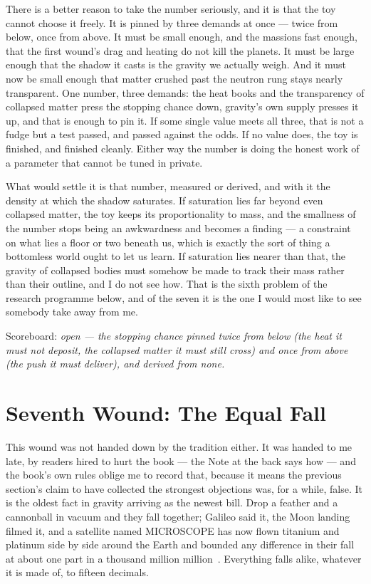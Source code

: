 \documentclass[fontsize=11pt,paper=a4,pagesize=auto,parskip=half-]{scrbook}
\begin{document}
There is a better reason to take the number seriously, and it is that the toy cannot choose it freely. It is pinned by three demands at once --- twice from below, once from above. It must be small enough, and the massions fast enough, that the first wound's drag and heating do not kill the planets. It must be large enough that the shadow it casts is the gravity we actually weigh. And it must now be small enough that matter crushed past the neutron rung stays nearly transparent. One number, three demands: the heat books and the transparency of collapsed matter press the stopping chance down, gravity's own supply presses it up, and that is enough to pin it. If some single value meets all three, that is not a fudge but a test passed, and passed against the odds. If no value does, the toy is finished, and finished cleanly. Either way the number is doing the honest work of a parameter that cannot be tuned in private.

What would settle it is that number, measured or derived, and with it the density at which the shadow saturates. If saturation lies far beyond even collapsed matter, the toy keeps its proportionality to mass, and the smallness of the number stops being an awkwardness and becomes a finding --- a constraint on what lies a floor or two beneath us, which is exactly the sort of thing a bottomless world ought to let us learn. If saturation lies nearer than that, the gravity of collapsed bodies must somehow be made to track their mass rather than their outline, and I do not see how. That is the sixth problem of the research programme below, and of the seven it is the one I would most like to see somebody take away from me.


Scoreboard: \emph{open --- the stopping chance pinned twice from below (the heat it must not deposit, the collapsed matter it must still cross) and once from above (the push it must deliver), and derived from none.}

\section{Seventh Wound: The Equal Fall}

This wound was not handed down by the tradition either. It was handed to me late, by readers hired to hurt the book --- the Note at the back says how --- and the book's own rules oblige me to record that, because it means the previous section's claim to have collected the strongest objections was, for a while, false. It is the oldest fact in gravity arriving as the newest bill. Drop a feather and a cannonball in vacuum and they fall together; Galileo said it, the Moon landing filmed it, and a satellite named MICROSCOPE has now flown titanium and platinum side by side around the Earth and bounded any difference in their fall at about one part in a thousand million million~\cite{touboul2022}. Everything falls alike, whatever it is made of, to fifteen decimals.
\end{document}
